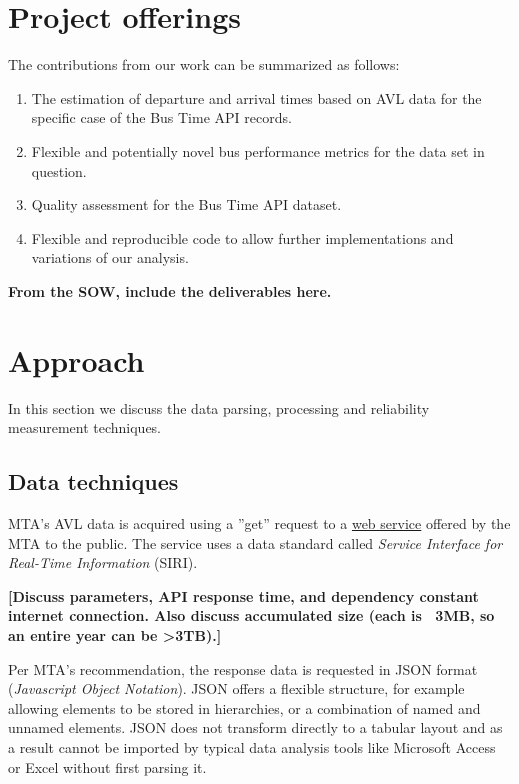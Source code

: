 \documentclass[12pt]{report}
\begin{document}
\newpage

\section{Project offerings}

The contributions from our work can be summarized as follows:

\begin{enumerate}
\item The estimation of departure and arrival times based on AVL data for the specific case of the Bus Time API records. 
\item Flexible and potentially novel bus performance metrics for the data set in question.
\item Quality assessment for the Bus Time API dataset.
\item Flexible and reproducible code to allow further implementations and variations of our analysis.

\end{enumerate}

\textbf{From the SOW, include the deliverables here.}

\newpage

\section{Approach}

In this section we discuss the data parsing, processing and reliability measurement techniques.

\subsection{Data techniques}

MTA's AVL data is acquired using a ''get'' request to a \href{http://bustime.mta.info/}{web service} offered by the MTA to the public.  The service uses a data standard called \textit{Service Interface for Real-Time Information} (SIRI). 

\textbf{[Discuss parameters, API response time, and dependency constant internet connection.  Also discuss accumulated size (each is ~3MB, so an entire year can be >3TB).]}

Per MTA's recommendation, the response data is requested in JSON format (\textit{Javascript Object Notation}).  JSON offers a flexible structure, for example allowing elements to be stored in hierarchies, or a combination of named and unnamed elements.  JSON does not transform directly to a tabular layout and as a result cannot be imported by typical data analysis tools like Microsoft Access or Excel without first parsing it.
\end{document}
